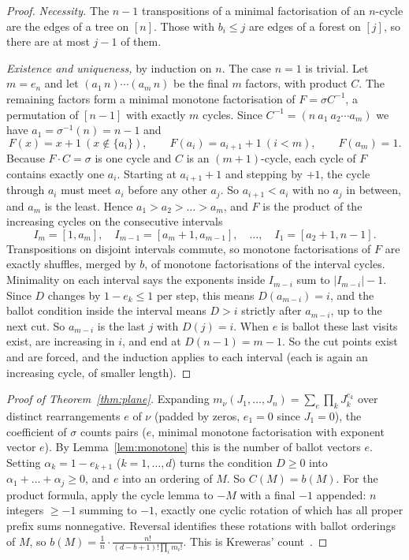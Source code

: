 \documentclass[11pt,a4paper]{article}
\theoremstyle{plain}
\theoremstyle{definition}
\theoremstyle{remark}
\begin{document}
\begin{proof}
\emph{Necessity.} The $n-1$ transpositions of a minimal factorisation of an $n$-cycle are the edges
of a tree on $[n]$. Those with $b_i \le j$ are edges of a forest on $[j]$, so there are at most
$j - 1$ of them.

\emph{Existence and uniqueness,} by induction on $n$. The case $n = 1$ is trivial. Let $m = e_n$
and let $(a_1\,n)\cdots(a_m\,n)$ be the final $m$ factors, with product $C$. The remaining
factors form a minimal monotone factorisation of $F = \sigma C^{-1}$, a permutation of $[n-1]$ with
exactly $m$ cycles. Since $C^{-1} = (n\ a_1\ a_2 \cdots a_m)$ we have $a_1 = \sigma^{-1}(n) = n-1$ and
\[
  F(x) = x + 1 \ (x \notin \{a_i\}), \qquad F(a_i) = a_{i+1} + 1 \ (i < m), \qquad F(a_m) = 1 .
\]
Because $F \cdot C = \sigma$ is one cycle and $C$ is an $(m+1)$-cycle, each cycle of $F$ contains
exactly one $a_i$. Starting at $a_{i+1} + 1$ and stepping by $+1$, the cycle through $a_i$ must meet
$a_i$ before any other $a_j$. So $a_{i+1} < a_i$ with no $a_j$ in between, and $a_m$ is the least.
Hence $a_1 > a_2 > \dots > a_m$, and $F$ is the product of the increasing cycles on the consecutive
intervals
\[
  I_m = [1, a_m],\quad I_{m-1} = [a_m + 1, a_{m-1}],\quad \dots,\quad I_1 = [a_2 + 1, n - 1].
\]
Transpositions on disjoint intervals commute, so monotone factorisations of $F$ are exactly
shuffles, merged by $b$, of monotone factorisations of the interval cycles. Minimality on each
interval says the exponents inside $I_{m-i}$ sum to $|I_{m-i}| - 1$. Since $D$ changes by
$1 - e_k \le 1$ per step, this means $D(a_{m-i}) = i$, and the ballot condition inside the interval
means $D > i$ strictly after $a_{m-i}$, up to the next cut. So $a_{m-i}$ is the last $j$ with
$D(j) = i$. When $e$ is ballot these last visits exist, are increasing in $i$, and end at
$D(n-1) = m - 1$. So the cut points exist and are forced, and the induction applies to each interval
(each is again an increasing cycle, of smaller length).
\end{proof}

\begin{proof}[Proof of Theorem~\ref{thm:plane}]
Expanding $m_\nu(J_1, \dots, J_n) = \sum_e \prod_k J_k^{e_k}$ over distinct rearrangements $e$ of
$\nu$ (padded by zeros, $e_1 = 0$ since $J_1 = 0$), the coefficient of $\sigma$ counts pairs
($e$, minimal monotone factorisation with exponent vector $e$). By Lemma~\ref{lem:monotone} this is the
number of ballot vectors $e$. Setting $\alpha_k = 1 - e_{k+1}$ ($k = 1, \dots, d$) turns the condition
$D \ge 0$ into $\alpha_1 + \dots + \alpha_j \ge 0$, and $e$ into an ordering of $M$. So $C(M) = b(M)$.
For the product formula, apply the cycle lemma to $-M$ with a final $-1$ appended: $n$ integers
$\ge -1$ summing to $-1$, exactly one cyclic rotation of which has all proper prefix sums nonnegative.
Reversal identifies these rotations with ballot orderings of $M$, so
$b(M) = \frac1n \cdot \frac{n!}{(d-b+1)!\prod_i m_i!}$. This is Kreweras' count~\cite{Kre72}.
\end{proof}
\end{document}
